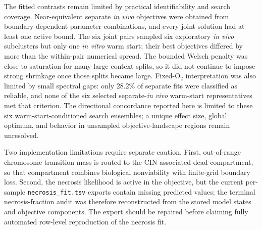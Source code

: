 \documentclass[11pt]{article}
\begin{document}
The fitted contrasts remain limited by practical identifiability and search coverage. Near-equivalent separate \textit{in vivo} objectives were obtained from boundary-dependent parameter combinations, and every joint solution had at least one active bound. The six joint pairs sampled six exploratory \textit{in vivo} subclusters but only one \textit{in vitro} warm start; their best objectives differed by more than the within-pair numerical spread. The bounded Welsch penalty was close to saturation for many large context splits, so it did not continue to impose strong shrinkage once those splits became large. Fixed-O$_2$ interpretation was also limited by small spectral gaps: only 28.2\% of separate fits were classified as reliable, and none of the six selected separate-\textit{in vivo} warm-start representatives met that criterion. The directional concordance reported here is limited to these six warm-start-conditioned search ensembles; a unique effect size, global optimum, and behavior in unsampled objective-landscape regions remain unresolved.

Two implementation limitations require separate caution. First, out-of-range chromosome-transition mass is routed to the CIN-associated dead compartment, so that compartment combines biological nonviability with finite-grid boundary loss. Second, the necrosis likelihood is active in the objective, but the current per-sample \texttt{necrosis\_fit.tsv} exports contain missing predicted values; the terminal necrosis-fraction audit was therefore reconstructed from the stored model states and objective components. The export should be repaired before claiming fully automated row-level reproduction of the necrosis fit.
\end{document}
